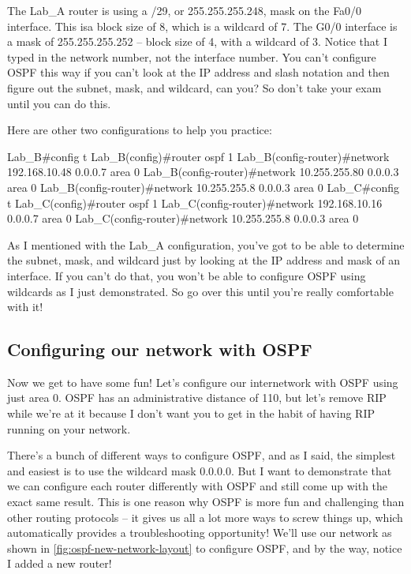 The Lab\_A router is using a /29, or 255.255.255.248, mask on the Fa0/0
interface. This isa block size of 8, which is a wildcard of 7. The G0/0
interface is a mask of 255.255.255.252 -- block size of 4, with a
wildcard of 3. Notice that I typed in the network number, not the
interface number. You can't configure OSPF this way if you can't look at
the IP address and slash notation and then figure out the subnet, mask,
and wildcard, can you? So don't take your exam until you can do this.

Here are other two configurations to help you practice:

\begin{cli}
Lab_B#config t
Lab_B(config)#router ospf 1
Lab_B(config-router)#network 192.168.10.48 0.0.0.7 area 0
Lab_B(config-router)#network 10.255.255.80 0.0.0.3 area 0
Lab_B(config-router)#network 10.255.255.8 0.0.0.3 area 0
Lab_C#config t
Lab_C(config)#router ospf 1
Lab_C(config-router)#network 192.168.10.16 0.0.0.7 area 0
Lab_C(config-router)#network 10.255.255.8 0.0.0.3 area 0
\end{cli}

As I mentioned with the Lab\_A configuration, you've got to be able to
determine the subnet, mask, and wildcard just by looking at the IP
address and mask of an interface. If you can't do that, you won't be
able to configure OSPF using wildcards as I just demonstrated. So go
over this until you're really comfortable with it!

\subsection{Configuring our network with OSPF}

Now we get to have some fun! Let's configure our internetwork with OSPF
using just area 0. OSPF has an administrative distance of 110, but let's
remove RIP while we're at it because I don't want you to get in the
habit of having RIP running on your network.

There's a bunch of different ways to configure OSPF, and as I said, the
simplest and easiest is to use the wildcard mask 0.0.0.0. But I want to
demonstrate that we can configure each router differently with OSPF and
still come up with the exact same result. This is one reason why OSPF is
more fun and challenging than other routing protocols -- it gives us all
a lot more ways to screw things up, which automatically provides a troubleshooting
opportunity! We'll use our network as shown in
\cref{fig:ospf-new-network-layout} to
configure OSPF, and by the way, notice I added a new router!


